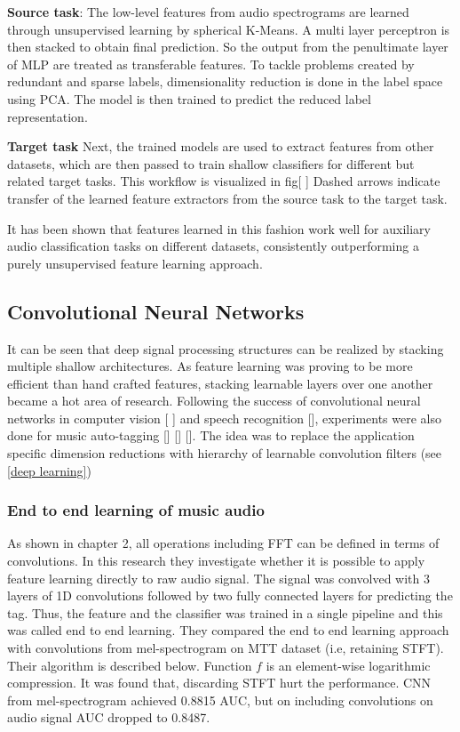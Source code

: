 \noindent \textbf{Source task}: 
The low-level features from audio spectrograms are learned through unsupervised learning by spherical K-Means. A multi layer perceptron is then stacked to obtain final prediction. So the output from the penultimate layer of MLP are treated as transferable features. To tackle problems created by redundant and sparse labels, dimensionality reduction is done in the label space using PCA. The model is then trained to predict the reduced label representation.
\bigskip

\noindent \textbf{Target task}
Next,  the trained models are used to extract features from other datasets, which are then passed to train shallow classifiers for different but related target tasks. This workflow is visualized in fig[ ] Dashed arrows indicate transfer of the learned feature extractors from the source task to the target task.
\bigskip

\noindent It has been shown that features learned in this fashion work well for auxiliary audio classification tasks on different datasets, consistently outperforming a purely unsupervised feature learning approach.

\subsection{Convolutional Neural Networks}
\label{convolution}
It can be seen that deep signal processing structures can be realized by stacking multiple shallow architectures. As feature learning was proving to be more efficient than hand crafted features, stacking learnable layers over one another became a hot area of research. Following the success of convolutional neural networks in computer vision [ ] and speech recognition [], experiments were also done for music auto-tagging [] [] []. The idea was to replace the application specific dimension reductions with hierarchy of learnable convolution filters (see \ref{deep learning}) 

\subsubsection{End to end learning of music audio}
As shown in chapter 2, all operations including FFT can be defined in terms of convolutions. In this research they investigate whether it is possible to apply feature learning directly to raw audio signal. The signal was convolved with 3 layers of 1D convolutions followed by two fully connected layers for predicting the tag. Thus, the feature and the classifier was trained in a single pipeline and this was called end to end learning. They compared the end to end learning approach with convolutions from mel-spectrogram on MTT dataset (i.e, retaining STFT). Their algorithm is described below. Function $f$ is an element-wise logarithmic compression. It was found that, discarding STFT hurt the performance. CNN from mel-spectrogram achieved 0.8815 AUC, but on including convolutions on audio signal AUC dropped to 0.8487.     
 

